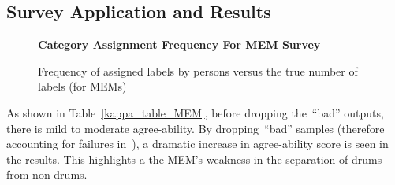 \documentclass[\main/thesis.tex]{subfiles}
\begin{document}
 \subsection{Survey Application and Results}
 \begin{table}[t]
\caption{\label{kappa_table_MEM}Table of Fleiss' kappa coefficient to measure the degree of agreement between persons (HvH) and persons and MEM. We measure the agreeability scores after dropping bad samples if both or either persons assigned the sample as such. We also measure agree-ability when all samples deemed \enquote{Bad} or \enquote{other} by either person are removed.}
\end{table}

\begin{figure}[htpb]
    \begin{center}
    \textbf{Category Assignment Frequency For MEM Survey}
    \end{center}
    \caption{Frequency of assigned labels by persons versus the true number of labels (for MEMs)}
\label{fig:freq-survey-2p}
\end{figure} 

 As shown in Table~\ref{kappa_table_MEM}, before dropping the~\enquote{bad} outputs, there is mild to moderate agree-ability. By dropping~\enquote{bad} samples (therefore accounting for failures in~\decfirst), a dramatic increase in agree-ability score is seen in the results.  This highlights a the MEM's weakness in the separation of drums from non-drums. 
\end{document}
